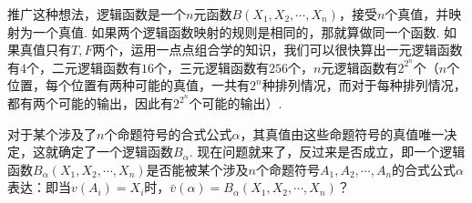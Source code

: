 推广这种想法，逻辑函数是一个\(n\)元函数\(B(X_1, X_2, \cdots, X_n)\)，接受\(n\)个真值，并映射为一个真值. 如果两个逻辑函数映射的规则是相同的，那就算做同一个函数. 如果真值只有\(T,F\)两个，运用一点点组合学的知识，我们可以很快算出一元逻辑函数有\(4\)个，二元逻辑函数有\(16\)个，三元逻辑函数有\(256\)个，\(n\)元逻辑函数有\(2^{2^n}\)个（\(n\)个位置，每个位置有两种可能的真值，一共有\(2^n\)种排列情况，而对于每种排列情况，都有两个可能的输出，因此有\(2^{2^n}\)个可能的输出）. 

对于某个涉及了\(n\)个命题符号的合式公式\(\alpha\)，其真值由这些命题符号的真值唯一决定，这就确定了一个逻辑函数\(B_\alpha\). 现在问题就来了，反过来是否成立，即一个逻辑函数\(B_\alpha(X_1, X_2, \cdots, X_n)\)是否能被某个涉及\(n\)个命题符号\(A_1, A_2, \cdots, A_n\)的合式公式\(\alpha\)表达：即当\(v(A_i)=X_i\)时，\(\bar{v}(\alpha) = B_\alpha(X_1, X_2, \cdots, X_n)\)？

